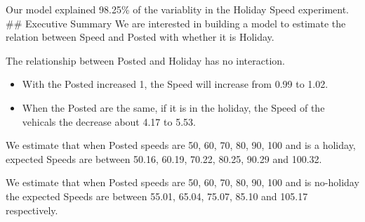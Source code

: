 \documentclass[
]{article}
\providecommand{\tightlist}{%
  \setlength{\itemsep}{0pt}\setlength{\parskip}{0pt}}
\begin{document}
Our model explained 98.25\% of the variablity in the Holiday Speed
experiment. \#\# Executive Summary We are interested in building a model
to estimate the relation between Speed and Posted with whether it is
Holiday.

The relationship between Posted and Holiday has no interaction.

\begin{itemize}
\tightlist
\item
  With the Posted increased 1, the Speed will increase from 0.99 to
  1.02.
\item
  When the Posted are the same, if it is in the holiday, the Speed of
  the vehicals the decrease about 4.17 to 5.53.
\end{itemize}

We estimate that when Posted speeds are 50, 60, 70, 80, 90, 100 and is a
holiday, expected Speeds are between 50.16, 60.19, 70.22, 80.25, 90.29
and 100.32.

We estimate that when Posted speeds are 50, 60, 70, 80, 90, 100 and is
no-holiday the expected Speeds are between 55.01, 65.04, 75.07, 85.10
and 105.17 respectively.
\end{document}
